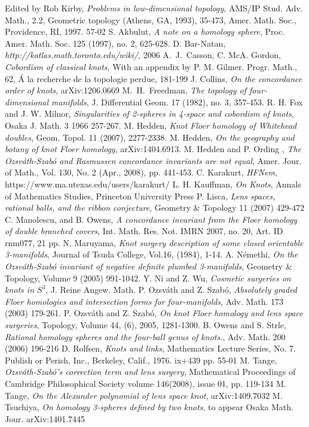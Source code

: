\documentclass[11pt]{amsart}
\begin{document}
\begin{thebibliography}{99}
 Edited by Rob Kirby, {\it Problems in low-dimensional topology}, AMS/IP Stud. Adv. Math., 2.2, Geometric topology (Athens, GA, 1993), 35-473, Amer. Math. Soc., Providence, RI, 1997. 57-02 
 S. Akbulut, {\it A note on a homology sphere}, Proc. Amer. Math. Soc. 125 (1997), no. 2, 625-628. 
 D. Bar-Natan, {\it http://katlas.math.toronto.edu/wiki/}, 2006
 A.\ J.\ Casson, C. McA. Gordon, {\it Cobordism of classical knots}, With an appendix by P. M. Gilmer. Progr. Math., 62, \'{A} la recherche de la topologie perdue, 181-199
 J. Collins, {\it On the concordance order of knots}, arXiv:1206.0669
 M.\ H.\ Freedman, {\it The topology of four-dimensional manifolds}, J. Differential Geom. 17 (1982), no. 3, 357-453.
 R. H. Fox and J. W. Milnor, {\it Singularities of 2-spheres in 4-space and cobordism of knots}, Osaka J. Math. 3 1966 257-267. 
 M. Hedden, {\it Knot Floer homology of Whitehead doubles}, Geom. Topol. 11 (2007), 2277-2338. 
 M. Hedden, {\it On the geography and botany of knot Floer homology}, arXiv:1404.6913. 
 M. Hedden and P. Ording , {\it The Ozsv\'ath-Szab\'o and Rasmussen concordance invariants are not equal}, Amer. Jour. of Math., Vol. 130, No. 2 (Apr., 2008), pp. 441-453. 
 C. Karakurt, {\it HFNem}, https://www.ma.utexas.edu/users/karakurt/
 L. H. Kauffman, {\it On Knots}, Annals of Mathematics Studies, Princeton University Press
 P. Lisca, {\it Lens spaces, rational balls, and the ribbon conjecture}, Geometry \& Topology 11 (2007) 429-472 
 C. Manolescu, and B. Owens, {\it A concordance invariant from the Floer homology of double branched covers}, Int. Math. Res. Not. IMRN 2007, no. 20, Art. ID rnm077, 21 pp.
 N. Maruyama, {\it Knot surgery description of some closed orientable 3-manifolds}, Journal of Tsuda College, Vol.16, (1984), 1-14. 
 A. N\'emethi, {\it On the Ozsv\'ath-Szab\'o invariant of negative definite plumbed 3-manifolds}, Geometry \& Topology, Volume 9 (2005) 991-1042.
 Y. Ni and Z. Wu, {\it Cosmetic surgeries on knots in $S^3$}, J. Reine Angew. Math.
 P. Ozsv\'ath and Z. Szab\'o, {\it Absolutely graded Floer homologies and intersection forms for four-manifolds}, Adv. Math. 173 (2003) 179-261.
 P. Ozsv\'ath and Z. Szab\'o, {\it On knot Floer homology and lens space surgeries}, Topology, Volume 44, (6), 2005,  1281-1300.
 B. Owens and S. Strle, {\it Rational homology spheres and the four-ball genus of knots.}, Adv. Math. 200 (2006) 196-216
 D. Rolfsen, {\it Knots and links}, Mathematics Lecture Series, No. 7. Publish or Perish, Inc., Berkeley, Calif., 1976. ix+439 pp. 55-01 
 M. Tange, {\it Ozsv\'ath-Szab\'o's correction term and lens surgery}, Mathematical Proceedings of Cambridge Philosophical Society volume 146(2008), issue 01, pp. 119-134
 M. Tange, {\it On the Alexander polynomial of lens space knot}, arXiv:1409.7032
 M. Tsuchiya, {\it On homology 3-spheres defined by two knots}, to appear Osaka Math. Jour. arXiv:1401.7445
\end{thebibliography}
\end{document}
